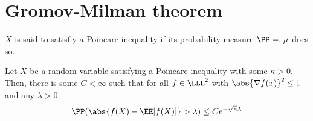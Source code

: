 \section{Gromov-Milman theorem}


$X$ is said to satisfiy a Poincare inequality if its probability measure $\PP=:\mu$ does so.


\begin{thm} 
    Let $X$ be a random variable satisfying a Poincare inequality with some $\kappa >0$. Then, there is some $C<\infty$ such that for all $f \in \LLL^2$ with $\abs{\nabla f(x)}^2\leq 1$ and any $\lambda>0$
    $$\PP(\abs{f(X)-\EE[f(X)]}>\lambda)\leq C e^{-\sqrt{\kappa}\lambda}$$
\end{thm}